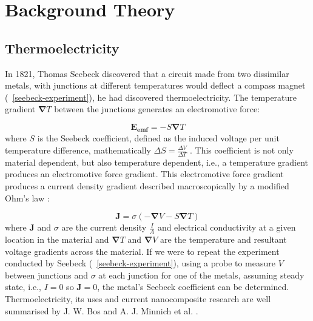 \documentclass[a4paper,10pt,journal]{IEEEtran}
\newcommand{\figref}[2][\figurename~]{#1\ref{#2}}
\renewcommand{\vec}[1]{\mathbf{#1}}	%
\begin{document}

\section{Background Theory}

\subsection{Thermoelectricity}
In 1821, Thomas Seebeck discovered that a circuit made from two
dissimilar metals, with junctions at different temperatures would
deflect a compass magnet (\figref{seebeck-experiment}), he had
discovered thermoelectricity. The temperature gradient $\vec{\nabla}
T$ between the junctions generates an electromotive force:

\begin{equation}
\label{seebeck-emf}
	\vec{E_{emf}} = -S \vec{\nabla} T
\end{equation}
where $S$ is the Seebeck coefficient, defined as the induced voltage per
unit temperature difference, mathematically $\Delta S = \frac{\Delta
V}{\Delta T}$ \cite{auparay}. This coefficient is not only material
dependent, but also temperature dependent, i.e., a temperature gradient
produces an electromotive force gradient. This electromotive force
gradient produces a current density gradient described macroscopically
by a modified Ohm's law \cite{ziman}:

\begin{equation}
\label{current-density}
	\vec{J} = \sigma (-\vec{\nabla} V - S \vec{\nabla} T)
\end{equation}
where $\vec{J}$ and $\sigma$ are the current density $\frac{I}{A}$ and
electrical conductivity at a given location in the material and
$\vec{\nabla} T$ and $\vec{\nabla} V$ are the temperature and
resultant voltage gradients across the material. If we were to repeat the
experiment conducted by Seebeck (\figref{seebeck-experiment}), using a
probe to measure $V$ between junctions and $\sigma$ at each junction
for one of the metals, assuming steady state, i.e., $I=0$ so $\vec{J} = 0$, the metal's Seebeck coefficient can be determined.\\
Thermoelectricity, its uses and current nanocomposite research are well
summarised by J. W. Bos \cite{bos-review} and A. J. Minnich et al.
\cite{minnich-review}.
\end{document}
